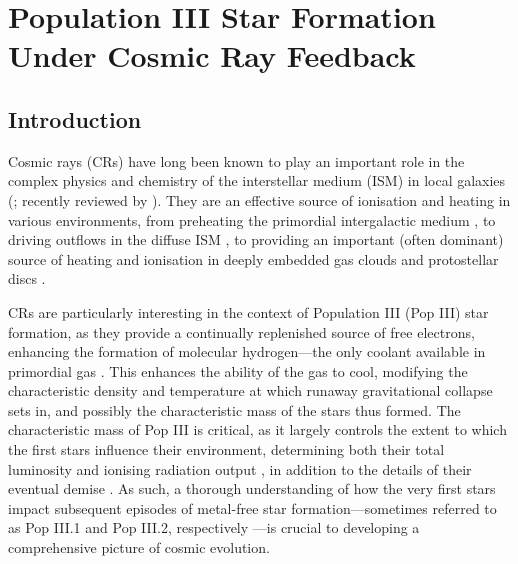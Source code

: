 \documentclass[../thesis.tex]{subfiles}
\begin{document}
\chapter{Population III Star Formation Under Cosmic Ray Feedback}
\section{Introduction}
\label{intro}

Cosmic rays (CRs) have long been known to play an important role in the complex physics and chemistry of the interstellar medium (ISM) in local galaxies (\citealt{SpitzerTomasko1968,SpitzerScott1969,GlassgoldLanger1973,GoldsmithLanger1978,CravensDalgarno1978,MannheimSchlickeiser1994,Tielens2005}; recently reviewed by \citealt{StrongMoskalenkoPtuskin2007,GrenierBlackStrong2015}).  
They are an effective source of ionisation and heating in various environments, from preheating the primordial intergalactic medium  \citep[IGM;][]{SazonovSunyaev2015}, to driving outflows in the diffuse ISM \citep[e.g.,][]{Ensslinetal2007,Jubelgasetal2008,SalemBryan2014,Hanaszetal2013,Boothetal2013,SalemBryanHummels2014}, to providing an important (often dominant) source of heating and ionisation in deeply embedded gas clouds and protostellar discs \citep{Spitzer1978,DalgarnoYanLiu1999,IndrioloFieldsMcCall2009,PadovaniGalliGlassgold2009,GlassgoldGalliPadovani2012,PadovaniHennebelleGalli2013,Padovanietal2015}. 

CRs are particularly interesting in the context of Population III (Pop III) star formation, as they provide a continually replenished source of free electrons, enhancing the formation of molecular hydrogen---the only coolant available in primordial gas \citep{Abeletal1997,GalliPalla1998,BrommCoppiLarson2002}.  
This enhances the ability of the gas to cool, modifying the characteristic density and temperature at which runaway gravitational collapse sets in, and possibly the characteristic mass of the stars thus formed.   
The characteristic mass of Pop III is critical, as it largely controls the extent to which the first stars influence their environment, determining both their total luminosity and ionising radiation output \citep{Schaerer2002}, in addition to the details of their eventual demise \citep{Hegeretal2003,HegerWoosley2010,MaederMeynet2012}. 
As such, a thorough understanding of how the very first stars impact subsequent episodes of metal-free star formation---sometimes referred to as Pop III.1 and Pop III.2, respectively \citep{McKeeTan2008}---is crucial to developing a comprehensive picture of cosmic evolution.
\end{document}
